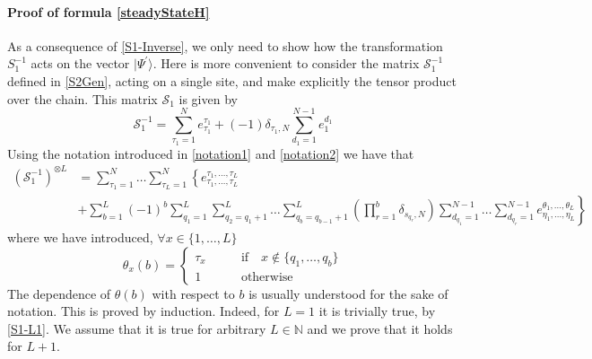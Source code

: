 \documentclass[10pt]{article}
\numberwithin{equation}{section}
\numberwithin{equation}{subsection}
\begin{document}
	\paragraph{Proof of formula \eqref{steadyStateH}} As a consequence of \eqref{S1-Inverse}, we only need to show how the transformation $S_{1}^{-1}$ acts on the vector $|\Psi^{'}\rangle$. Here is more convenient to consider the matrix $\mathcal{S}_{1}^{-1}$ defined in \eqref{S2Gen}, acting on a single site, and make explicitly the tensor product over the chain. This matrix $\mathcal{S}_{1}$ is given by
	\begin{equation}\label{S1-L1}
		\mathcal{S}_{1}^{-1}=\sum_{\tau_{1}=1}^{N}e_{\tau_{1}}^{\tau_{1}}+(-1)\delta_{\tau_{1},N}\sum_{d_{1}=1}^{N-1}e_{1}^{d_{1}}
	\end{equation}
	Using the notation introduced in \eqref{notation1} and \eqref{notation2} we have that 
	\begin{equation}
		\begin{split}
			\left(\mathcal{S}_{1}^{-1}\right)^{\otimes L}&=\sum_{\tau_{1}=1}^{N}\ldots\sum_{\tau_{L}=1}^{N}\left\{e_{\tau_{1},\ldots,\tau_{L}}^{\tau_{1},\ldots,\tau_{L}}\right.
			\\&
			+\left.\sum_{b=1}^{L}(-1)^{b}\sum_{q_{1}=1}^{L}\sum_{q_{2}=q_{1}+1}^{L}\ldots\sum_{q_{b}=q_{b-1}+1}^{L}\left(\prod_{r=1}^{b}\delta_{s_{q_{r}},N}\right)\sum_{d_{q_{1}}=1}^{N-1}\ldots\sum_{d_{q_{r}}=1}^{N-1}e_{\eta_{1},\ldots,\eta_{L}}^{\theta_{1},\ldots,\theta_{L}}\right\} 
		\end{split}
	\end{equation}
	where we have introduced, $\forall x\in \{1,\ldots,L\}$
	\begin{equation}
			\theta_{x}(b)=\begin{cases}
				\tau_{x}\qquad &\text{if}\quad x\notin \{q_{1},\ldots,q_{b}\}\\
				1 \qquad &\text{otherwise}
			\end{cases}
		\end{equation}
		The dependence of $\theta(b)$ with respect to $b$ is usually understood for the sake of notation. 
		This is proved by induction. Indeed, for $L=1$ it is trivially true, by \eqref{S1-L1}. We assume that it is true for arbitrary $L\in \mathbb{N}$ and we prove that it holds for $L+1$. 
\end{document}
